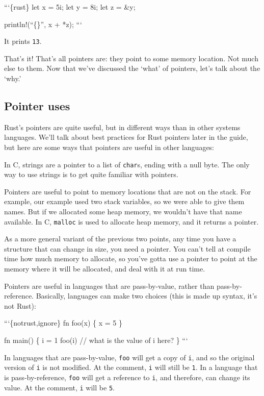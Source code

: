 \documentclass[]{article}
\begin{document}
```\{rust\} let x = 5i; let y = 8i; let z = \&y;

println!(``\{\}'', x + *z); ```

It prints \texttt{13}.

That's it! That's all pointers are: they point to some memory location.
Not much else to them. Now that we've discussed the `what' of pointers,
let's talk about the `why.'

\subsection{Pointer uses}\label{pointer-uses}

Rust's pointers are quite useful, but in different ways than in other
systems languages. We'll talk about best practices for Rust pointers
later in the guide, but here are some ways that pointers are useful in
other languages:

In C, strings are a pointer to a list of \texttt{char}s, ending with a
null byte. The only way to use strings is to get quite familiar with
pointers.

Pointers are useful to point to memory locations that are not on the
stack. For example, our example used two stack variables, so we were
able to give them names. But if we allocated some heap memory, we
wouldn't have that name available. In C, \texttt{malloc} is used to
allocate heap memory, and it returns a pointer.

As a more general variant of the previous two points, any time you have
a structure that can change in size, you need a pointer. You can't tell
at compile time how much memory to allocate, so you've gotta use a
pointer to point at the memory where it will be allocated, and deal with
it at run time.

Pointers are useful in languages that are pass-by-value, rather than
pass-by-reference. Basically, languages can make two choices (this is
made up syntax, it's not Rust):

```\{notrust,ignore\} fn foo(x) \{ x = 5 \}

fn main() \{ i = 1 foo(i) // what is the value of i here? \} ```

In languages that are pass-by-value, \texttt{foo} will get a copy of
\texttt{i}, and so the original version of \texttt{i} is not modified.
At the comment, \texttt{i} will still be \texttt{1}. In a language that
is pass-by-reference, \texttt{foo} will get a reference to \texttt{i},
and therefore, can change its value. At the comment, \texttt{i} will be
\texttt{5}.
\end{document}
